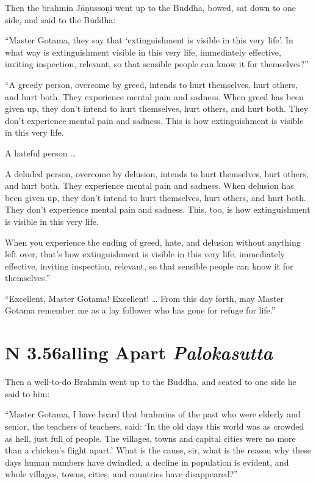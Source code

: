\documentclass[12pt,openany]{book}%
\newcommand*{\suttatitleacronym}[1]{\smaller[2]{#1}\vspace*{.3em}}
\newcommand*{\suttatitletranslation}[1]{\linebreak{#1}}
\newcommand*{\suttatitleroot}[1]{\linebreak\smaller[2]\itshape{#1}}
\newcommand*{\tocacronym}[1]{\hspace*{-3.3em}{#1}\quad}
\newcommand*{\toctranslation}[1]{#1}
\newcommand*{\tocroot}[1]{(\textit{#1})}
\begin{document}
Then the brahmin \textsanskrit{Jāṇussoṇi} went up to the Buddha, bowed, sat down to one side, and said to the Buddha: 

“Master Gotama, they say that ‘extinguishment is visible in this very life’. In what way is extinguishment visible in this very life, immediately effective, inviting inspection, relevant, so that sensible people can know it for themselves?” 

“A greedy person, overcome by greed, intends to hurt themselves, hurt others, and hurt both. They experience mental pain and sadness. When greed has been given up, they don’t intend to hurt themselves, hurt others, and hurt both. They don’t experience mental pain and sadness. This is how extinguishment is visible in this very life. 

A hateful person … 

A deluded person, overcome by delusion, intends to hurt themselves, hurt others, and hurt both. They experience mental pain and sadness. When delusion has been given up, they don’t intend to hurt themselves, hurt others, and hurt both. They don’t experience mental pain and sadness. This, too, is how extinguishment is visible in this very life. 

When you experience the ending of greed, hate, and delusion without anything left over, that’s how extinguishment is visible in this very life, immediately effective, inviting inspection, relevant, so that sensible people can know it for themselves.” 

“Excellent, Master Gotama! Excellent! … From this day forth, may Master Gotama remember me as a lay follower who has gone for refuge for life.” 

%
\section*{{\suttatitleacronym AN 3.56}{\suttatitletranslation Falling Apart }{\suttatitleroot Palokasutta}}
\addcontentsline{toc}{section}{\tocacronym{AN 3.56} \toctranslation{Falling Apart } \tocroot{Palokasutta}}

Then a well-to-do Brahmin went up to the Buddha, and seated to one side he said to him: 

“Master Gotama, I have heard that brahmins of the past who were elderly and senior, the teachers of teachers, said: ‘In the old days this world was as crowded as hell, just full of people. The villages, towns and capital cities were no more than a chicken’s flight apart.’ What is the cause, sir, what is the reason why these days human numbers have dwindled, a decline in population is evident, and whole villages, towns, cities, and countries have disappeared?” 
\end{document}
